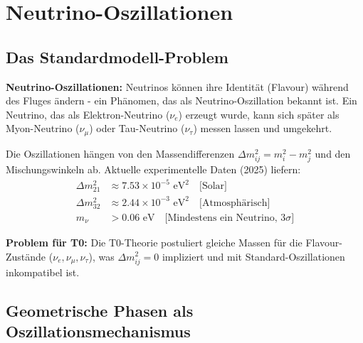 \documentclass[12pt,a4paper]{article}
\begin{document}
	\section{Neutrino-Oszillationen}
	
	\subsection{Das Standardmodell-Problem}
	
	\begin{warning}
		\textbf{Neutrino-Oszillationen:} Neutrinos können ihre Identität (Flavour) während des Fluges ändern - ein Phänomen, das als Neutrino-Oszillation bekannt ist. Ein Neutrino, das als Elektron-Neutrino ($\nu_e$) erzeugt wurde, kann sich später als Myon-Neutrino ($\nu_\mu$) oder Tau-Neutrino ($\nu_\tau$) messen lassen und umgekehrt.
		
		Die Oszillationen hängen von den Massendifferenzen $\Delta m^2_{ij} = m_i^2 - m_j^2$ und den Mischungswinkeln ab. Aktuelle experimentelle Daten (2025) liefern:
		\begin{align}
			\Delta m^2_{21} &\approx 7.53 \times 10^{-5} \text{ eV}^2 \quad \text{[Solar]} \\
			\Delta m^2_{32} &\approx 2.44 \times 10^{-3} \text{ eV}^2 \quad \text{[Atmosphärisch]} \\
			m_\nu &> 0.06 \text{ eV} \quad \text{[Mindestens ein Neutrino, 3}\sigma\text{]}
		\end{align}
		
		\textbf{Problem für T0:}
		Die T0-Theorie postuliert gleiche Massen für die Flavour-Zustände ($\nu_e, \nu_\mu, \nu_\tau$), was $\Delta m^2_{ij} = 0$ impliziert und mit Standard-Oszillationen inkompatibel ist.
	\end{warning}
	
	\subsection{Geometrische Phasen als Oszillationsmechanismus}
	
\end{document}
